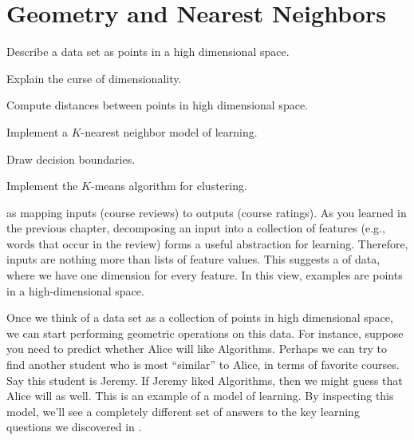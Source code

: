 \chapter{Geometry and Nearest Neighbors} \label{sec:knn}



\begin{learningobjectives}
\item Describe a data set as points in a high dimensional space.
\item Explain the curse of dimensionality.
\item Compute distances between points in high dimensional space.
\item Implement a $K$-nearest neighbor model of learning.
\item Draw decision boundaries.
\item Implement the $K$-means algorithm for clustering.
\end{learningobjectives}


 as mapping inputs
(course reviews) to outputs (course ratings).  As you learned in the
previous chapter, decomposing an input into a collection of features
(e.g., words that occur in the review) forms a useful abstraction for
learning.  Therefore, inputs are nothing more than lists of feature
values.  This suggests a  of data, where we
have one dimension for every feature.  In this view, examples are
points in a high-dimensional space.

Once we think of a data set as a collection of points in high
dimensional space, we can start performing geometric operations on
this data.  For instance, suppose you need to predict whether Alice
will like Algorithms.  Perhaps we can try to find another student who
is most ``similar'' to Alice, in terms of favorite courses.  Say this
student is Jeremy.  If Jeremy liked Algorithms, then we might guess
that Alice will as well.  This is an example of a  model of learning.  By inspecting this model, we'll see a
completely different set of answers to the key learning questions we
discovered in .

